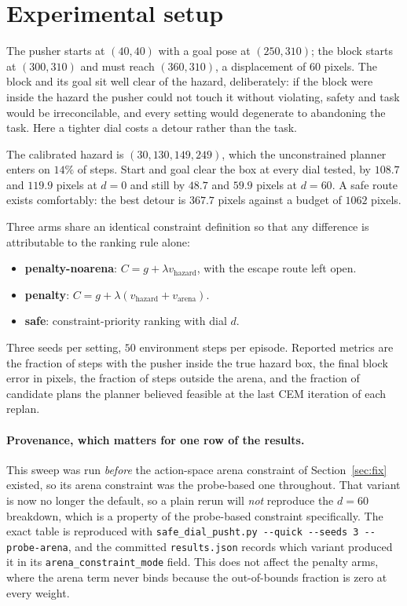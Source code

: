 \documentclass[11pt,a4paper]{article}
\newcommand{\dial}{\ensuremath{d}}
\begin{document}
\section{Experimental setup}

The pusher starts at $(40, 40)$ with a goal pose at $(250, 310)$; the block starts at
$(300, 310)$ and must reach $(360, 310)$, a displacement of $60$ pixels. The block and its
goal sit well clear of the hazard, deliberately: if the block were inside the hazard the
pusher could not touch it without violating, safety and task would be irreconcilable, and
every setting would degenerate to abandoning the task. Here a tighter dial costs a detour
rather than the task.

The calibrated hazard is $(30, 130, 149, 249)$, which the unconstrained planner enters on
$14\%$ of steps. Start and goal clear the box at every dial tested, by $108.7$ and $119.9$
pixels at $\dial = 0$ and still by $48.7$ and $59.9$ pixels at $\dial = 60$. A safe route
exists comfortably: the best detour is $367.7$ pixels against a budget of $1062$ pixels.

Three arms share an identical constraint definition so that any difference is attributable to
the ranking rule alone:

\begin{itemize}
  \item \textbf{penalty-noarena}: $C = g + \lambda v_{\text{hazard}}$, with the escape route
    left open.
  \item \textbf{penalty}: $C = g + \lambda (v_{\text{hazard}} + v_{\text{arena}})$.
  \item \textbf{safe}: constraint-priority ranking with dial $\dial$.
\end{itemize}

Three seeds per setting, $50$ environment steps per episode. Reported metrics are the fraction
of steps with the pusher inside the true hazard box, the final block error in pixels, the
fraction of steps outside the arena, and the fraction of candidate plans the planner believed
feasible at the last CEM iteration of each replan.

\paragraph{Provenance, which matters for one row of the results.} This sweep was run
\emph{before} the action-space arena constraint of Section~\ref{sec:fix} existed, so its arena
constraint was the probe-based one throughout. That variant is now no longer the default, so a
plain rerun will \emph{not} reproduce the $\dial = 60$ breakdown, which is a property of the
probe-based constraint specifically. The exact table is reproduced with
\texttt{safe\_dial\_pusht.py -{}-quick -{}-seeds 3 -{}-probe-arena}, and the committed
\texttt{results.json} records which variant produced it in its
\texttt{arena\_constraint\_mode} field. This does not affect the penalty arms, where the arena
term never binds because the out-of-bounds fraction is zero at every weight.
\end{document}
